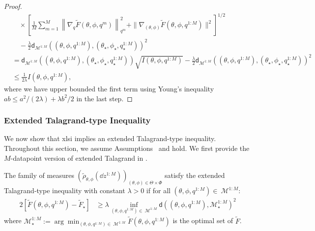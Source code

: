 \begin{proof}
\begin{align*}
        &\quad \times \left[\frac{1}{M}\sum_{m=1}^M \left\| \nabla_{q} { \tilde{F}(\theta, \phi, q^m)} \right\|_{q^m}^2 + \|\nabla_{(\theta, \phi)} \tilde{F}(\theta, \phi, q^{1:M})\|^2\right]^{1/2} \\
        &\quad - \frac{\lambda}{2}\mathsf{d}_{\mathcal{M}^{1:M}}((\theta, \phi, q^{1:M}), (\theta_\star, \phi_\star, q_\star^{1:M}))^2 \\
        &= {\mathsf{d}_{\mathcal{M}^{1:M}}((\theta, \phi, q^{1:M}), (\theta_\star, \phi_\star, q_\star^{1:M}))} \sqrt{I(\theta, \phi, q^{1:M})} - \frac{\lambda}{2}\mathsf{d}_{\mathcal{M}^{1:M}}((\theta, \phi, q^{1:M}), (\theta_\star, \phi_\star, q_\star^{1:M}))^2 \\
        &\leq \frac{1}{2\lambda} I(\theta, \phi, q^{1:M}),
    \end{align*}
    where we have upper bounded the first term using Young's inequality $ab \leq a^2/(2\lambda) + \lambda b^2/2$ in the last step.
\end{proof}


\subsubsection{Extended Talagrand-type Inequality}
We now show that \gls*{xlsi} implies an extended Talagrand-type inequality. Throughout this section, we assume Assumptions~ and  hold. We first provide the $M$-datapoint version of extended Talagrand in \citet{caprioerrorboundsparticle2024}.
\begin{definition}\label{defn:xTalagrand}
    The family of measures $(\tilde{\rho}_{\theta,\phi}(\dd z^{1:M}))_{(\theta,\phi)\in\Theta\times\Phi}$ satisfy the extended Talagrand-type inequality with constant $\lambda>0$ if for all $(\theta, \phi,q^{1:M}) \in \ \mathcal{M}^{1:M}$:
    \begin{align}
        2[\tilde{F}(\theta, \phi, q^{1:M})-\tilde{F}_\star] &\geq \lambda\inf_{(\theta, \phi,q^{1:M}) \in \ \mathcal{M}^{1:M}} \mathsf{d}((\theta, \phi, q^{1:M}), \mathcal{M}^{1:M}_\star)^2
    \end{align}
    where $\mathcal{M}^{1:M}_\star:=\arg\min_{(\theta, \phi,q^{1:M}) \in \ \mathcal{M}^{1:M}} \tilde{F}(\theta, \phi, q^{1:M})$ is the optimal set of $\tilde{F}$.
\end{definition}

